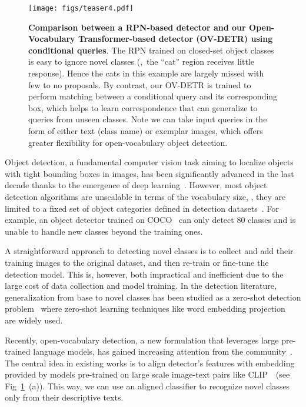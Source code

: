 \documentclass[runningheads]{llncs}
\begin{document}
\begin{figure}[!t]
    \centering
    \texttt{[image: figs/teaser4.pdf]}
    \caption{
    \textbf{Comparison between a RPN-based detector and our Open-Vocabulary Transformer-based detector (OV-DETR) using conditional queries}. The RPN trained on closed-set object classes is easy to ignore novel classes (\eg,~the ``cat'' region receives little response). Hence the cats in this example are largely missed with few to no proposals. By contrast, our OV-DETR is trained to perform matching between a conditional query and its corresponding box, which helps to learn correspondence that can generalize to queries from unseen classes. Note we can take input queries in the form of either text (class name) or exemplar images, which offers greater flexibility for open-vocabulary object detection.
    }
    \label{fig:teaser}
\end{figure}

Object detection, a fundamental computer vision task aiming to localize objects with tight bounding boxes in images, has been significantly advanced in the last decade thanks to the emergence of deep learning~\cite{papageorgiou2000trainable,szegedy2013deep,felzenszwalb2008discriminatively,ren2015faster,he2017mask}. However, most object detection algorithms are unscalable in terms of the vocabulary size, \ie, they are limited to a fixed set of object categories defined in detection datasets~\cite{everingham2010pascal,lin2014microsoft}. For example, an object detector trained on COCO~\cite{lin2014microsoft} can only detect 80 classes and is unable to handle new classes beyond the training ones.

A straightforward approach to detecting novel classes is to collect and add their training images to the original dataset, and then re-train or fine-tune the detection model. This is, however, both impractical and inefficient due to the large cost of data collection and model training. In the detection literature, generalization from base to novel classes has been studied as a zero-shot detection problem~\cite{bansal2018zero} where zero-shot learning techniques like word embedding projection~\cite{frome2013devise} are widely used.

Recently, open-vocabulary detection, a new formulation that leverages large pre-trained language models, has gained increasing attention from the community~\cite{zareian2021open,gu2021open}. The central idea in existing works is to align detector's features with embedding provided by models pre-trained on large scale image-text pairs like CLIP~\cite{radford2021learning}~(see Fig~\ref{fig:teaser}~(a)). This way, we can use an aligned classifier to recognize novel classes only from their descriptive texts.
\end{document}
